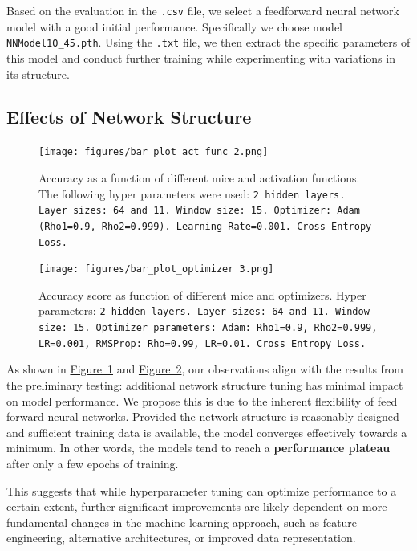 \documentclass{article}
\begin{document}
\begin{multicols}{2}
Based on the evaluation in the \texttt{.csv} file, we select a feedforward neural network model with a good initial performance. Specifically we choose model \texttt{NNModel1O\_45.pth}. Using the \texttt{.txt} file, we then extract the specific parameters of this model and conduct further training while experimenting with variations in its structure.

\subsection*{Effects of Network Structure}

\begin{figure}[H]
    \centering
    \texttt{[image: figures/bar\_plot\_act\_func 2.png]} 
    \caption{Accuracy as a function of different mice and activation functions. The following hyper parameters were used: \texttt{2 hidden layers. Layer sizes: 64 and 11. Window size: 15. Optimizer: Adam (Rho1=0.9, Rho2=0.999). Learning Rate=0.001. Cross Entropy Loss.}}
    \label{fig:ffnn_act_func}
\end{figure}

\begin{figure}[H]
    \centering
    \texttt{[image: figures/bar\_plot\_optimizer 3.png]} 
    \caption{Accuracy score as function of different mice and optimizers. Hyper parameters: \texttt{2 hidden layers. Layer sizes: 64 and 11. Window size: 15. Optimizer parameters: Adam: Rho1=0.9, Rho2=0.999, LR=0.001, RMSProp: Rho=0.99, LR=0.01. Cross Entropy Loss.}}
    \label{fig:ffnn_opt}
\end{figure}

As shown in \hyperref[fig:ffnn_act_func]{Figure~\ref*{fig:ffnn_act_func}} and \hyperref[fig:ffnn_opt]{Figure~\ref*{fig:ffnn_opt}}, our observations align with the results from the preliminary testing: additional network structure tuning has minimal impact on model performance. We propose this is due to the inherent flexibility of feed forward neural networks. Provided the network structure is reasonably designed and sufficient training data is available, the model converges effectively towards a minimum. In other words, the models tend to reach a \textbf{performance plateau} after only a few epochs of training.

This suggests that while hyperparameter tuning can optimize performance to a certain extent, further significant improvements are likely dependent on more fundamental changes in the machine learning approach, such as feature engineering, alternative architectures, or improved data representation.


\end{multicols}
\end{document}
